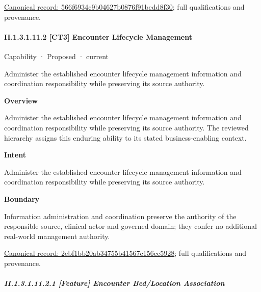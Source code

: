 {\footnotesize \href{../../../../continuum/strategy/capability/feature/566f6934c9b04627b0876f91bedd8f30.md}{Canonical record: 566f6934c9b04627b0876f91bedd8f30}; full qualifications and provenance.}\par
\paragraph*{II.1.3.1.11.2 [CT3] Encounter Lifecycle Management}
\label{navigation:II.1.3.1.11.2}

\label{element:2ebf1bb20ab34755b41567c156cc5928}
{\small Capability · Proposed · current}\par

Administer the established encounter lifecycle management information and coordination responsibility while preserving its source authority.



\textbf{Overview}



Administer the established encounter lifecycle management information and coordination responsibility while preserving its source authority. The reviewed hierarchy assigns this enduring ability to its stated business-enabling context.



\textbf{Intent}



Administer the established encounter lifecycle management information and coordination responsibility while preserving its source authority.



\textbf{Boundary}



Information administration and coordination preserve the authority of the responsible source, clinical actor and governed domain; they confer no additional real-world management authority.


{\footnotesize \href{../../../../continuum/strategy/capability/2ebf1bb20ab34755b41567c156cc5928.md}{Canonical record: 2ebf1bb20ab34755b41567c156cc5928}; full qualifications and provenance.}\par
\subparagraph*{II.1.3.1.11.2.1 [Feature] Encounter Bed/Location Association}
\label{navigation:II.1.3.1.11.2.1}

